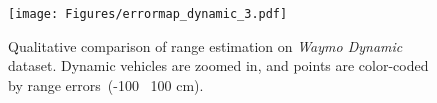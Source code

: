 \begin{figure}[t]
  \centering
   \texttt{[image: Figures/errormap\_dynamic\_3.pdf]}
   
   \caption{Qualitative comparison of range estimation on \textit{Waymo Dynamic} dataset. Dynamic vehicles are zoomed in, and points are color-coded by range errors~(-100 \bwrDyNFL~100 cm).
   }
   \label{fig:errormap_dynamic}
   
\end{figure}







